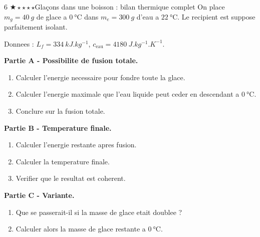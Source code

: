 \documentclass[11pt,a4paper]{article}
\newcommand{\diffone}{\(\bigstar\star\star\star\star\)}
\begin{document}
\begin{probleme}{6 \diffone}{Glaçons dans une boisson : bilan thermique complet}
On place \(m_g=\SI{40}{g}\) de glace a \(\SI{0}{\celsius}\) dans \(m_e=\SI{300}{g}\) d'eau a \(\SI{22}{\celsius}\). Le recipient est suppose parfaitement isolant.

Donnees : \(L_f=\SI{334}{kJ.kg^{-1}}\), \(c_{\text{eau}}=\SI{4180}{J.kg^{-1}.K^{-1}}\).

\textbf{Partie A - Possibilite de fusion totale.}
\begin{enumerate}
\item Calculer l'energie necessaire pour fondre toute la glace.
\item Calculer l'energie maximale que l'eau liquide peut ceder en descendant a \(\SI{0}{\celsius}\).
\item Conclure sur la fusion totale.
\end{enumerate}

\textbf{Partie B - Temperature finale.}
\begin{enumerate}[resume]
\item Calculer l'energie restante apres fusion.
\item Calculer la temperature finale.
\item Verifier que le resultat est coherent.
\end{enumerate}

\textbf{Partie C - Variante.}
\begin{enumerate}[resume]
\item Que se passerait-il si la masse de glace etait doublee ?
\item Calculer alors la masse de glace restante a \(\SI{0}{\celsius}\).
\end{enumerate}
\end{probleme}
\end{document}
